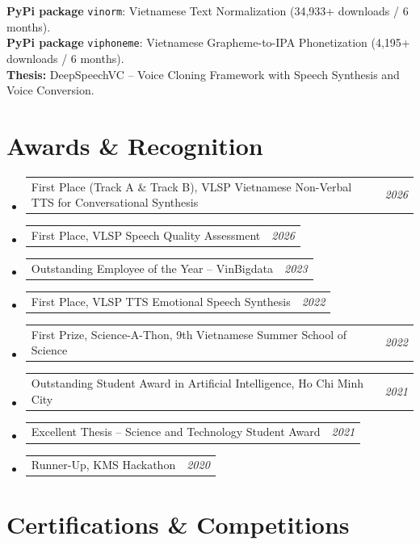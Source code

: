 \documentclass[10pt,a4paper]{article}
\makeatletter
\newcommand{\cvline}[2]{%
  \noindent
  \begin{tabular*}{\linewidth}{@{}l@{\extracolsep{\fill}}r@{}}
    #1 & \textit{\small #2}
  \end{tabular*}%
}
\makeatother
\begin{document}
\vspace{2pt}
\noindent\textbf{PyPi package} \texttt{vinorm}: Vietnamese Text Normalization (34,933+ downloads / 6 months).\\
\noindent\textbf{PyPi package} \texttt{viphoneme}: Vietnamese Grapheme-to-IPA Phonetization (4,195+ downloads / 6 months).\\[2pt]
\noindent\textbf{Thesis:} DeepSpeechVC -- Voice Cloning Framework with Speech Synthesis and Voice Conversion.

\section{Awards \& Recognition}

\begin{itemize}
  \item \cvline{First Place (Track A \& Track B), VLSP Vietnamese Non-Verbal TTS for Conversational Synthesis}{2026}
  \item \cvline{First Place, VLSP Speech Quality Assessment}{2026}
  \item \cvline{Outstanding Employee of the Year -- VinBigdata}{2023}
  \item \cvline{First Place, VLSP TTS Emotional Speech Synthesis}{2022}
  \item \cvline{First Prize, Science-A-Thon, 9th Vietnamese Summer School of Science}{2022}
  \item \cvline{Outstanding Student Award in Artificial Intelligence, Ho Chi Minh City}{2021}
  \item \cvline{Excellent Thesis -- Science and Technology Student Award}{2021}
  \item \cvline{Runner-Up, KMS Hackathon}{2020}
\end{itemize}

\section{Certifications \& Competitions}
\end{document}
